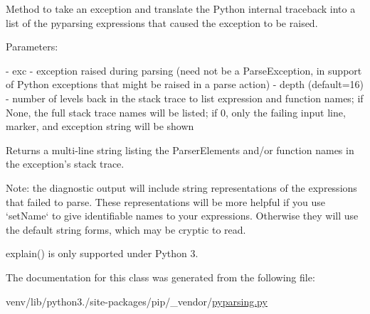 \begin{DoxyVerb}Method to take an exception and translate the Python internal traceback into a list
of the pyparsing expressions that caused the exception to be raised.

Parameters:

 - exc - exception raised during parsing (need not be a ParseException, in support
   of Python exceptions that might be raised in a parse action)
 - depth (default=16) - number of levels back in the stack trace to list expression
   and function names; if None, the full stack trace names will be listed; if 0, only
   the failing input line, marker, and exception string will be shown

Returns a multi-line string listing the ParserElements and/or function names in the
exception's stack trace.

Note: the diagnostic output will include string representations of the expressions
that failed to parse. These representations will be more helpful if you use `setName` to
give identifiable names to your expressions. Otherwise they will use the default string
forms, which may be cryptic to read.

explain() is only supported under Python 3.
\end{DoxyVerb}
 

The documentation for this class was generated from the following file\+:\begin{DoxyCompactItemize}
\item 
venv/lib/python3./site-\/packages/pip/\+\_\+vendor/\hyperlink{pip_2__vendor_2pyparsing_8py}{pyparsing.\+py}\end{DoxyCompactItemize}
